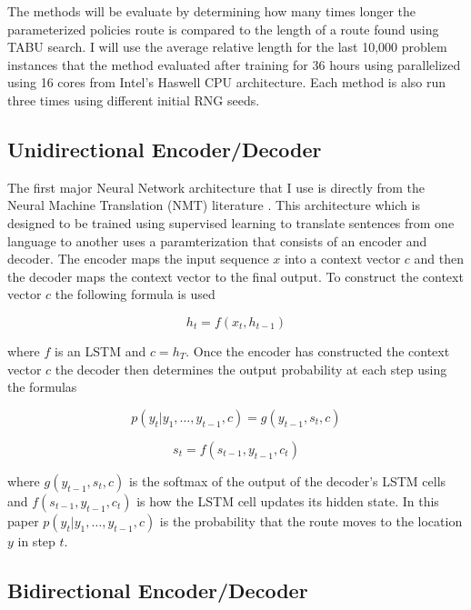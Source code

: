 \documentclass[12pt]{article}
\begin{document}
The methods will be evaluate by determining how many times longer the parameterized policies route is compared to the length of a route found using TABU search. I will use the average relative length for the last 10,000 problem instances that the method evaluated after training for 36 hours using parallelized using 16 cores from Intel's Haswell CPU architecture. Each method is also run three times using different initial RNG seeds.

\subsection{Unidirectional Encoder/Decoder}

The first major Neural Network architecture that I use is directly from the Neural Machine Translation (NMT) literature \citep{2014_sut}. This architecture which is designed to be trained using supervised learning to translate sentences from one language to another uses a paramterization that consists of an encoder and decoder. The encoder maps the input sequence $x$ into a context vector $c$ and then the decoder maps the context vector to the final output. To construct the context vector $c$ the following formula is used

\begin{equation*}
  h_t=f(x_t,h_{t-1})
\end{equation*}

where $f$ is an LSTM and $c=h_T$.
Once the encoder has constructed the context vector $c$ the decoder then determines the output probability at each step using the formulas

\begin{equation*}
  p(y_t|y_1,\dots,y_{t-1}, c)=g(y_{t-1},s_t, c)
\end{equation*}

\begin{equation*}
  s_t=f(s_{t-1},y_{t-1},c_t)
\end{equation*}

where $g(y_{t-1},s_t, c)$ is the softmax of the output of the decoder's LSTM cells and $f(s_{t-1},y_{t-1},c_t)$ is how the LSTM cell updates its hidden state. In this paper $p(y_t|y_1,\dots,y_{t-1}, c)$ is the probability that the route moves to the location $y$ in step $t$.

\subsection{Bidirectional Encoder/Decoder}
\end{document}
